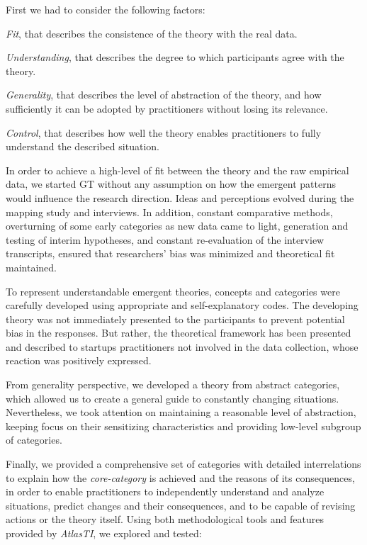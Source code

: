 \documentclass[10pt,journal,letterpaper,compsoc]{IEEEtran}
\begin{document}
First we had to consider the following factors:

\par\vspace {0.4cm}
\begin{compactitem}
\item \textit{Fit}, that describes the consistence of the theory with the real data.
\item \textit{Understanding}, that describes the degree to which participants agree with the theory.
\item \textit{Generality}, that describes the level of abstraction of the theory, and how sufficiently it can be adopted by practitioners without losing its relevance.
\item \textit{Control}, that describes how well the theory enables practitioners to fully understand the described situation.
\end{compactitem}
\par\vspace {0.4cm}

In order to achieve a high-level of fit between the theory and the raw empirical data, we started GT without any assumption on how the emergent patterns would influence the research direction. Ideas and perceptions evolved during the mapping study and interviews. In addition, constant comparative methods, overturning of some early categories as new data came to light, generation and testing of interim hypotheses, and constant re-evaluation of the interview transcripts, ensured that researchers' bias was minimized and theoretical fit maintained.

To represent understandable emergent theories, concepts and categories were carefully developed using appropriate and self-explanatory codes. The developing theory was not immediately presented to the participants to prevent potential bias in the responses. But rather, the theoretical framework has been presented and described to startups practitioners not involved in the data collection, whose reaction was positively expressed.

From generality perspective, we developed a theory from abstract categories, which allowed us to create a general guide to constantly changing situations. Nevertheless, we took attention on maintaining a reasonable level of abstraction, keeping focus on their sensitizing characteristics and providing low-level subgroup of categories.

Finally, we provided a comprehensive set of categories with detailed interrelations to explain how the \textit{core-category} is achieved and the reasons of its consequences, in order to enable practitioners to independently understand and analyze situations, predict changes and their consequences, and to be capable of revising actions or the theory itself. Using both methodological tools and features provided by \textit{AtlasTI}, we explored and tested:
\end{document}
